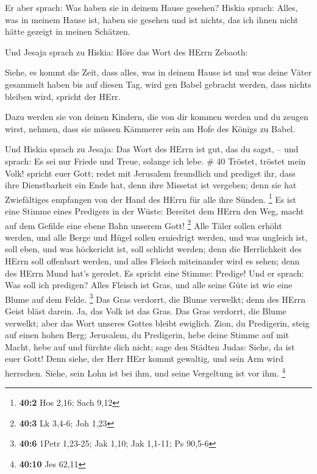  Er aber sprach: Was haben sie in deinem Hause gesehen?
Hiskia sprach: Alles, was in meinem Hause ist, haben sie gesehen und ist
nichts, das ich ihnen nicht hätte gezeigt in meinen Schätzen.

 Und Jesaja sprach zu Hiskia: Höre das Wort des HErrn
Zebaoth:

 Siehe, es kommt die Zeit, dass alles, was in deinem Hause
ist und was deine Väter gesammelt haben bis auf diesen Tag, wird gen
Babel gebracht werden, dass nichts bleiben wird, spricht der HErr.

 Dazu werden sie von deinen Kindern, die von dir kommen
werden und du zeugen wirst, nehmen, dass sie müssen Kämmerer sein am
Hofe des Königs zu Babel.

 Und Hiskia sprach zu Jesaja: Das Wort des HErrn ist gut,
das du sagst, -- und sprach: Es sei nur Friede und Treue, solange ich
lebe. \# 40  Tröstet, tröstet mein Volk! spricht euer Gott;
 redet mit Jerusalem freundlich und prediget ihr, dass ihre
Dienstbarkeit ein Ende hat, denn ihre Missetat ist vergeben; denn sie
hat Zwiefältiges empfangen von der Hand des HErrn für alle ihre Sünden.
\footnote{\textbf{40:2} Hos 2,16; Sach 9,12}  Es ist eine
Stimme eines Predigers in der Wüste: Bereitet dem HErrn den Weg, macht
auf dem Gefilde eine ebene Bahn unserem Gott! \footnote{\textbf{40:3} Lk
  3,4-6; Joh 1,23}  Alle Täler sollen erhöht werden, und
alle Berge und Hügel sollen erniedrigt werden, und was ungleich ist,
soll eben, und was höckericht ist, soll schlicht werden; 
denn die Herrlichkeit des HErrn soll offenbart werden, und alles Fleisch
miteinander wird es sehen; denn des HErrn Mund hat's geredet.
 Es spricht eine Stimme: Predige! Und er sprach: Was soll
ich predigen? Alles Fleisch ist Gras, und alle seine Güte ist wie eine
Blume auf dem Felde. \footnote{\textbf{40:6} 1Petr 1,23-25; Jak 1,10;
  Jak 1,1-11; Ps 90,5-6}  Das Gras verdorrt, die Blume
verwelkt; denn des HErrn Geist bläst darein. Ja, das Volk ist das Gras.
 Das Gras verdorrt, die Blume verwelkt; aber das Wort
unseres Gottes bleibt ewiglich.  Zion, du Predigerin, steig
auf einen hohen Berg; Jerusalem, du Predigerin, hebe deine Stimme auf
mit Macht, hebe auf und fürchte dich nicht; sage den Städten Judas:
Siehe, da ist euer Gott!  Denn siehe, der Herr HErr kommt
gewaltig, und sein Arm wird herrschen. Siehe, sein Lohn ist bei ihm, und
seine Vergeltung ist vor ihm. \footnote{\textbf{40:10} Jes 62,11}

